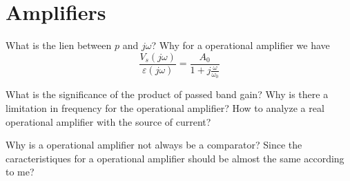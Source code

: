 \section{Amplifiers}

What is the lien between $p$ and $j\omega$? Why for a operational amplifier we have
$$
\frac{V_s(j\omega)}{\varepsilon(j\omega)}=\frac{A_0}{1+j\frac{\omega}{\omega_0}}
$$

What is the significance of the product of passed band gain? Why is there a limitation in frequency for the operational amplifier? How to analyze a real operational amplifier with the source of current?

Why is a operational amplifier not always be a comparator? Since the caracteristiques for a operational amplifier should be almost the same according to me?